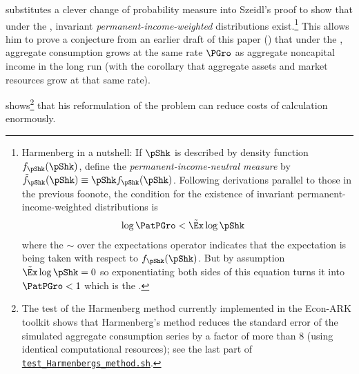 \documentclass[BufferStockTheory]{subfiles}
\begin{document}
\cite{harmenbergInvariant} substitutes a clever change of probability measure into Szeidl's proof to show that under the {\GIC}, invariant \emph{permanent-income-weighted} distributions exist.\footnote{Harmenberg in a nutshell:  If $\pShk$ is described by density function $f_\pShk(\pShk)$, define the \emph{permanent-income-neutral measure} by $\Harm{f}_\pShk(\pShk) \equiv \pShk f_\pShk(\pShk)$.  Following derivations parallel to those in the previous foonote, the condition for the existence of invariant permanent-income-weighted distributions is
  \begin{align*}
    \log \PatPGro  & < \Harm{\Ex} \log \pShk
  \end{align*}
  where the $\sim$ over the expectations operator indicates that the expectation is being taken with respect to $f_\pShk(\pShk)$.  But by assumption $\Harm{\Ex} \log \pShk = 0$ so exponentiating both sides of this equation turns it into $\PatPGro < 1$ which is the {\GIC}.}  This allows him to prove a conjecture from an earlier draft of this paper (\cite{BufferStockTheoryQESubmit}) that under the {\GIC}, aggregate consumption grows at the same rate $\PGro$ as aggregate noncapital income in the long run (with the corollary that aggregate assets and market resources grow at that same rate).


\hypertarget{test-Harmenbergs-method}{}
\cite{harmenbergInvariant} shows\footnote{The test of the Harmenberg method currently implemented in the Econ-ARK toolkit shows that Harmenberg's method reduces the standard error of the simulated aggregate consumption series by a factor of more than 8 (using identical computational resources); see the last part of \href{https://github.com/econ-ark/BufferStockTheory/blob/master/Code/Python/test_Harmenbergs_method.sh}{\texttt{test\_Harmenbergs\_method.sh}}.} that his reformulation of the problem can reduce costs of calculation enormously.  %
\end{document}
